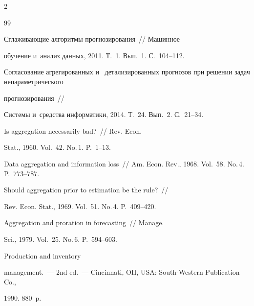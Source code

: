 \begin{multicols}{2}
{{\begin{thebibliography}{99}

 Сглаживающие алгоритмы прогнозирования~// Машинное

    обучение и~анализ данных, 2011. Т.~1. Вып.~1. С.~104--112.




 Согласование агрегированных и~    детализированных прогнозов при решении задач непараметрического

    прогнозирования~//

    Системы и~средства информатики, 2014. Т.~24. Вып.~2. С.~21--34.




 Is aggregation necessarily bad?~// Rev. Econ.

Stat., 1960. Vol.~42. No.\,1. P.~1--13.





Data aggregation and information loss~// Am. Econ. Rev., 1968. Vol.~58. No.\,4. P.~773--787.




 Should aggregation prior to estimation be the rule?~//

Rev. Econ. Stat., 1969. Vol.~51. No.\,4. P.~409--420.




 Aggregation and proration in forecasting~// Manage.

    Sci., 1979. Vol.~25. No.\,6. P.~594--603.




 Production and inventory

    management.~--- 2nd ed.~--- Cincinnati, OH, USA: South-Western Publication Co.,

    1990. 880~p.




\end{thebibliography}}}
\end{multicols}
